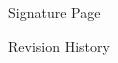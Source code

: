 %
%
%
%
%
%

\newpage

\begin{center} 
\Large{Signature Page}\\
\end{center}

\noindent \namesigdate{} \hfill \namesigdate{} \hfill \namesigdate{}

\newpage

\begin{center}
\Large{Revision History}\\
\end{center}

